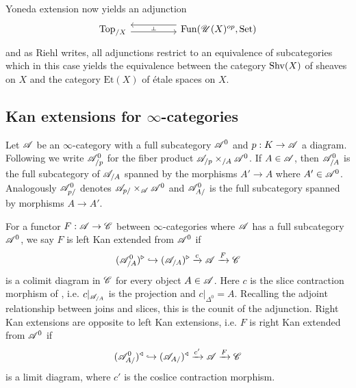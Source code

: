 \documentclass[../../thesis.tex]{subfiles}
\begin{document}
Yoneda extension now yields an adjunction
\[\begin{tikzcd}
        {\mathrm{Top}_{/X}} && {\Fun(\Open(X)^{op},\SET)}
        \arrow[""{name=0, anchor=center, inner sep=0}, shift right=1, from=1-1, to=1-3]
        \arrow[""{name=1, anchor=center, inner sep=0}, shift right=2, from=1-3, to=1-1]
        \arrow["\dashv"{anchor=center, rotate=-90}, draw=none, from=1, to=0]
    \end{tikzcd}\]
and as Riehl writes, all adjunctions restrict to an equivalence of subcategories which in this case yields the equivalence between the category $\mathrm{Shv}(X)$ of sheaves on $X$ and the category $\mathrm{Et}(X)$ of étale spaces on $X$.
\subsection{Kan extensions for $\infty$-categories}
\begin{definition}
    Let $\mathscr{A}$ be an $\infty$-category with a full subcategory $\mathscr{A}^0$ and $p:K\to \mathscr{A}$ a diagram.
    Following \cite[Notation 4.3.2.1]{HTT} we write $\mathscr{A}^0_{/p}$ for the fiber product $\mathscr{A}_{/p}\times_{/A}\mathscr{A}^0$.
    If $A\in \mathscr{A}$, then $\mathscr{A}^0_{/A}$ is the full subcategory of $\mathscr{A}_{/A}$ spanned by the morphisms $A'\to A$ where $A'\in \mathscr{A}^0$.
    \newline
    Analogously $\mathscr{A}^0_{p/}$ denotes $\mathscr{A}_{p/}\times_{\mathscr{A}}\mathscr{A}^0$ and $\mathscr{A}^0_{A/}$ is the full subcategory spanned by morphisms $A\to A'$.
\end{definition}
\begin{definition}\label{KanDef}
    For a functor $F: \mathscr{A} \to \mathscr{C}$ between $\infty$-categories where $\mathscr{A}$ has a full subcategory $\mathscr{A}^0$, we say $F$ is left Kan extended from $\mathscr{A}^{0}$ if
    \[
        (\mathscr{A}^{0}_{/A})^{\triangleright} \hookrightarrow (\mathscr{A}_{/A})^{\triangleright} \xrightarrow{c} \mathscr{A} \xrightarrow{F}\mathscr{C}
    \]
    is a colimit diagram in $\mathscr{C}$ for every object $A\in \mathscr{A}$.
    Here $c$ is the slice contraction morphism of \cite[\href{https://kerodon.net/tag/0188}{Tag 0188}]{kerodon}, i.e.
    $c|_{\mathscr{A}_{/A}}$ is the projection and $c|_{\Delta^0}=A$.
    Recalling the adjoint relationship between joins and slices, this is the counit of the adjunction.
    \newline
    Right Kan extensions are opposite to left Kan extensions, i.e. $F$ is right Kan extended from $\mathscr{A}^0$ if
    \[
        (\mathscr{A}^{0}_{A/})^{\triangleleft} \hookrightarrow (\mathscr{A}_{A/})^{\triangleleft} \xrightarrow{c'} \mathscr{A} \xrightarrow{F}\mathscr{C}
    \]
    is a limit diagram, where $c'$ is the coslice contraction morphism.
\end{definition}
\end{document}
